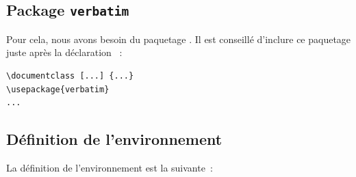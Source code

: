 \subsection{Package \texttt{verbatim}}
Pour cela, nous avons besoin du paquetage . Il est conseillé d'inclure ce paquetage juste après la déclaration ~:

{\singlespacing
\begin{verbatim}
\documentclass [...] {...}
\usepackage{verbatim}
...
\end{verbatim}
}

\subsection{Définition de l'environnement}
La définition de l'environnement  est la suivante~:



